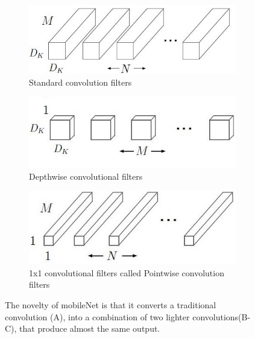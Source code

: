 \begin{figure}[!h]
	\centering
	\begin{subfigure}{0.32\textwidth}
		\includegraphics[width=\linewidth]{images/architecture_mobileNet1}
		\caption{Standard convolution filters}
		\label{fig:sub_architecture_mobileNet1}
	\end{subfigure}
	\begin{subfigure}{0.32\textwidth}
		\includegraphics[width=\linewidth]{images/architecture_mobileNet2}
		\caption{Depthwise convolutional filters}
		\label{fig:sub_architecture_mobileNet2}
	\end{subfigure}
	\begin{subfigure}{0.32\textwidth}
		\includegraphics[width=\linewidth]{images/architecture_mobileNet3}
		\caption{1x1 convolutional filters called Pointwise convolution filters}
		\label{fig:sub_architecture_mobileNet3}
	\end{subfigure}
	\caption{The novelty of mobileNet is that it converts a traditional convolution (A), into a combination of two lighter convolutions(B-C), that produce almost the same output.}
	\label{fig:architecture_mobileNet}
\end{figure}



